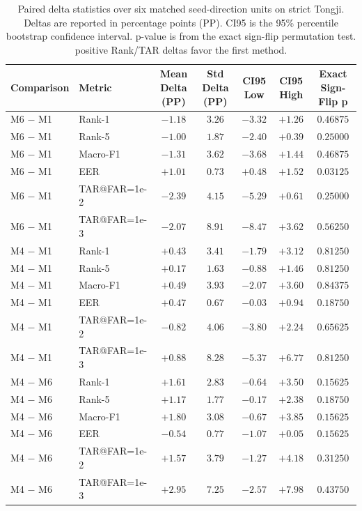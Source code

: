 \begin{table}[t]
\centering
\scriptsize
\caption{Paired delta statistics over six matched seed-direction units on strict Tongji. Deltas are reported in percentage points (PP). CI95 is the 95\% percentile bootstrap confidence interval. p-value is from the exact sign-flip permutation test. positive Rank/TAR deltas favor the first method.}
\label{tab:paired_statistics_component_ablation}
\begin{tabular}{llccccc}
\toprule
Comparison & Metric & Mean Delta (PP) & Std Delta (PP) & CI95 Low & CI95 High & Exact Sign-Flip p \\
\midrule
M6 $-$ M1 & Rank-1 & $-1.18$ & $3.26$ & $-3.32$ & $+1.26$ & $0.46875$ \\
M6 $-$ M1 & Rank-5 & $-1.00$ & $1.87$ & $-2.40$ & $+0.39$ & $0.25000$ \\
M6 $-$ M1 & Macro-F1 & $-1.31$ & $3.62$ & $-3.68$ & $+1.44$ & $0.46875$ \\
M6 $-$ M1 & EER & $+1.01$ & $0.73$ & $+0.48$ & $+1.52$ & $0.03125$ \\
M6 $-$ M1 & TAR@FAR=1e-2 & $-2.39$ & $4.15$ & $-5.29$ & $+0.61$ & $0.25000$ \\
M6 $-$ M1 & TAR@FAR=1e-3 & $-2.07$ & $8.91$ & $-8.47$ & $+3.62$ & $0.56250$ \\
\midrule
M4 $-$ M1 & Rank-1 & $+0.43$ & $3.41$ & $-1.79$ & $+3.12$ & $0.81250$ \\
M4 $-$ M1 & Rank-5 & $+0.17$ & $1.63$ & $-0.88$ & $+1.46$ & $0.81250$ \\
M4 $-$ M1 & Macro-F1 & $+0.49$ & $3.93$ & $-2.07$ & $+3.60$ & $0.84375$ \\
M4 $-$ M1 & EER & $+0.47$ & $0.67$ & $-0.03$ & $+0.94$ & $0.18750$ \\
M4 $-$ M1 & TAR@FAR=1e-2 & $-0.82$ & $4.06$ & $-3.80$ & $+2.24$ & $0.65625$ \\
M4 $-$ M1 & TAR@FAR=1e-3 & $+0.88$ & $8.28$ & $-5.37$ & $+6.77$ & $0.81250$ \\
\midrule
M4 $-$ M6 & Rank-1 & $+1.61$ & $2.83$ & $-0.64$ & $+3.50$ & $0.15625$ \\
M4 $-$ M6 & Rank-5 & $+1.17$ & $1.77$ & $-0.17$ & $+2.38$ & $0.18750$ \\
M4 $-$ M6 & Macro-F1 & $+1.80$ & $3.08$ & $-0.67$ & $+3.85$ & $0.15625$ \\
M4 $-$ M6 & EER & $-0.54$ & $0.77$ & $-1.07$ & $+0.05$ & $0.15625$ \\
M4 $-$ M6 & TAR@FAR=1e-2 & $+1.57$ & $3.79$ & $-1.27$ & $+4.18$ & $0.31250$ \\
M4 $-$ M6 & TAR@FAR=1e-3 & $+2.95$ & $7.25$ & $-2.57$ & $+7.98$ & $0.43750$ \\
\bottomrule
\end{tabular}%
\end{table}
